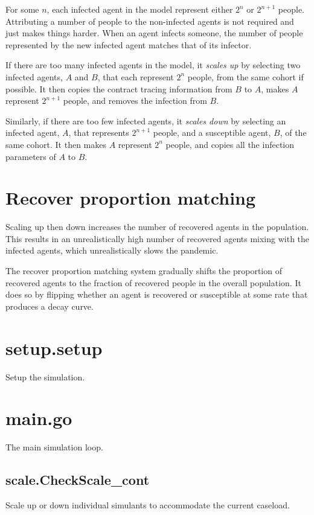 \documentclass[]{article}
\begin{document}
For some $n$, each infected agent in the model represent either $2^n$ or $2^{n+1}$ people. Attributing a number of people to the non-infected agents is not required and just makes things harder. When an agent infects someone, the number of people represented by the new infected agent matches that of its infector.

If there are too many infected agents in the model, it \textit{scales up} by selecting two infected agents, $A$ and $B$, that each represent $2^n$ people, from the same cohort if possible. It then copies the contract tracing information from $B$ to $A$, makes $A$ represent $2^{n+1}$ people, and removes the infection from $B$.

Similarly, if there are too few infected agents, it \textit{scales down} by selecting an infected agent, $A$, that represents $2^{n+1}$ people, and a susceptible agent, $B$, of the same cohort. It then makes $A$ represent $2^n$ people, and copies all the infection parameters of $A$ to $B$.

\section{Recover proportion matching}
Scaling up then down increases the number of recovered agents in the population. This results in an unrealistically high number of recovered agents mixing with the infected agents, which unrealistically slows the pandemic.

The recover proportion matching system gradually shifts the proportion of recovered agents to the fraction of recovered people in the overall population. It does so by flipping whether an agent is recovered or susceptible at some rate that produces a decay curve.

\pagebreak

\section{setup.setup}
Setup the simulation.

\section{main.go}
The main simulation loop.

\subsection{scale.CheckScale\_cont}
Scale up or down individual simulants to accommodate the current caseload.
\end{document}
